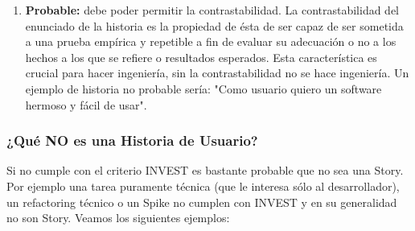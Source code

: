 \begin{enumerate}
\item \textbf{Probable:} debe poder permitir la contrastabilidad. La contrastabilidad del enunciado de la historia es la propiedad de ésta de ser capaz de ser sometida a una prueba empírica y repetible a fin de evaluar su adecuación o no a los hechos a los que se refiere o resultados esperados. Esta característica es crucial para hacer ingeniería, sin la contrastabilidad no se hace ingeniería. Un ejemplo de historia no probable sería: "Como usuario quiero un software hermoso y fácil de usar".

\end{enumerate}

\subsubsection{¿Qué NO es una Historia de Usuario?}

Si no cumple con el criterio INVEST es bastante probable que no sea una Story. Por ejemplo una tarea puramente técnica (que le interesa sólo al desarrollador), un refactoring técnico o un Spike no cumplen con INVEST y en su generalidad no son Story. 
Veamos los siguientes ejemplos:

